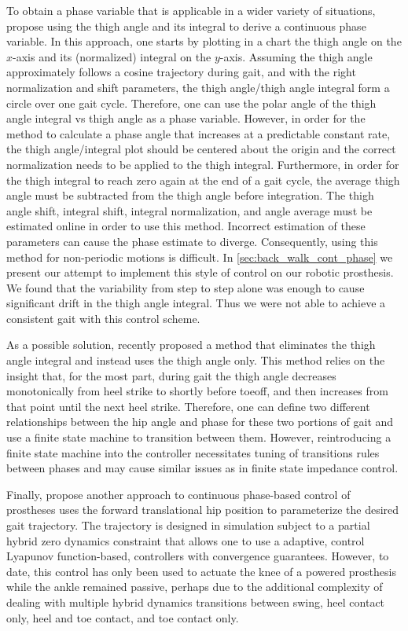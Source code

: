 To obtain a phase variable that is applicable in a wider variety of situations,
\citet{quintero2016preliminary} propose using the thigh angle and its integral
to derive a continuous phase variable. In this approach, one starts by plotting
in a chart the thigh angle on the $x$-axis and its (normalized) integral on the
$y$-axis. Assuming the thigh angle approximately follows a cosine trajectory
during gait, and with the right normalization and shift parameters, the thigh
angle/thigh angle integral form a circle over one gait cycle. Therefore, one can
use the polar angle of the thigh angle integral vs thigh angle as a phase
variable.  However, in order for the method to calculate a phase angle that
increases at a predictable constant rate, the thigh angle/integral plot should
be centered about the origin and the correct normalization needs to be applied
to the thigh integral.  Furthermore, in order for the thigh integral to reach
zero again at the end of a gait cycle, the average thigh angle must be
subtracted from the thigh angle before integration. The thigh angle shift,
integral shift, integral normalization, and angle average must be estimated
online in order to use this method. Incorrect estimation of these parameters can
cause the phase estimate to diverge. Consequently, using this method for
non-periodic motions is difficult.  In \cref{sec:back_walk_cont_phase} we
present our attempt to implement this style of control on our robotic
prosthesis. We found that the variability from step to step alone was enough to
cause significant drift in the thigh angle integral.  Thus we were not able to
achieve a consistent gait with this control scheme.

As a possible solution, \citet{rezazadeh2018phase} recently proposed a method
that eliminates the thigh angle integral and instead uses the thigh angle only.
This method relies on the insight that, for the most part, during gait the thigh
angle decreases monotonically from heel strike to shortly before toeoff, and
then increases from that point until the next heel strike. Therefore, one can
define two different relationships between the hip angle and phase for these two
portions of gait and use a finite state machine to transition between them.
However, reintroducing a finite state machine into the controller necessitates
tuning of transitions rules between phases and may cause similar issues as in
finite state impedance control.

Finally, \citet{azimi2019model} propose another approach to continuous
phase-based control of prostheses uses the forward translational hip position to
parameterize the desired gait trajectory. The trajectory is designed in
simulation subject to a partial hybrid zero dynamics constraint that allows one
to use a adaptive, control Lyapunov function-based, controllers with convergence
guarantees. However, to date, this control has only been used to actuate the
knee of a powered prosthesis while the ankle remained passive, perhaps due to
the additional complexity of dealing with multiple hybrid dynamics transitions
between swing, heel contact only, heel and toe contact, and toe contact only.

